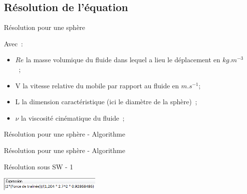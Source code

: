 \documentclass{beamer}
\begin{document}
\subsection{Résolution de l'équation}
\begin{frame}{Résolution pour une sphère}
\begin{center}
\end{center}
Avec~:
\begin{itemize}
 \item $Re$ la masse volumique du fluide dans lequel a lieu le déplacement en $kg.m^{-3}$~;
 \item V la vitesse relative du mobile par rapport au fluide en $m.s^{-1}$;
 \item L la dimension caractéristique (ici le diamètre de la sphère)~;
 \item $\nu$ la viscosité cinématique du fluide~;
\end{itemize}
\end{frame}

\begin{frame}{Résolution pour une sphère - Algorithme}
  \begin{center}
    
  \end{center}
\end{frame}

\begin{frame}{Résolution pour une sphère - Algorithme}
  \begin{center}
    
  \end{center}
\end{frame}

\begin{frame}{Résolution sous SW - 1}
  \begin{center}
    \includegraphics[width=5cm]{../Images/expressionCX.png}
  \end{center}
\end{frame}
\end{document}
